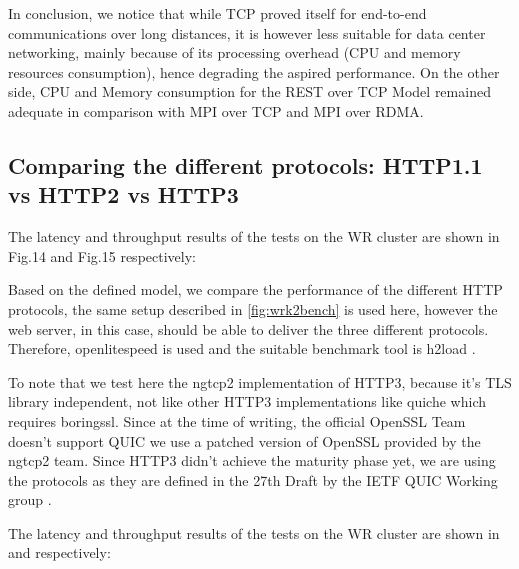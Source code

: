 \documentclass[runningheads]{llncs}
\begin{document}
In conclusion, we notice that while TCP proved itself for end-to-end communications over long distances, it is however less suitable for data center networking, mainly because of its processing overhead (CPU and memory resources consumption), hence degrading the aspired performance. On the other side, CPU and Memory consumption for the REST over TCP Model remained adequate in comparison with MPI over TCP and MPI over RDMA.


\subsection{Comparing the different protocols: HTTP1.1 vs HTTP2 vs HTTP3}


The latency and throughput results of the tests on the WR cluster are shown in Fig.14 and Fig.15 respectively:





Based on the defined model, we compare the performance of the different HTTP protocols, the same setup described in \cref{fig:wrk2bench} is used here, however the web server, in this case, should be able to deliver the three different protocols. Therefore, openlitespeed \cite{openlitespeed} is used and the suitable benchmark tool is h2load \cite{h2load}.


To note that we test here the ngtcp2 \cite{ngtcp2} implementation of HTTP3, because it's TLS library independent, not like other HTTP3 implementations like quiche \cite{quiche} which requires boringssl. Since at the time of writing, the official OpenSSL Team doesn’t support QUIC \cite{opensslquicblog} we use a patched version of OpenSSL provided by the ngtcp2 team.
Since HTTP3 didn't achieve the maturity phase yet, we are using the protocols as they are defined in the 27th Draft by the IETF QUIC Working group \cite{quicwg}.

The latency and throughput results of the tests on the WR cluster are shown in  and  respectively:
\end{document}
